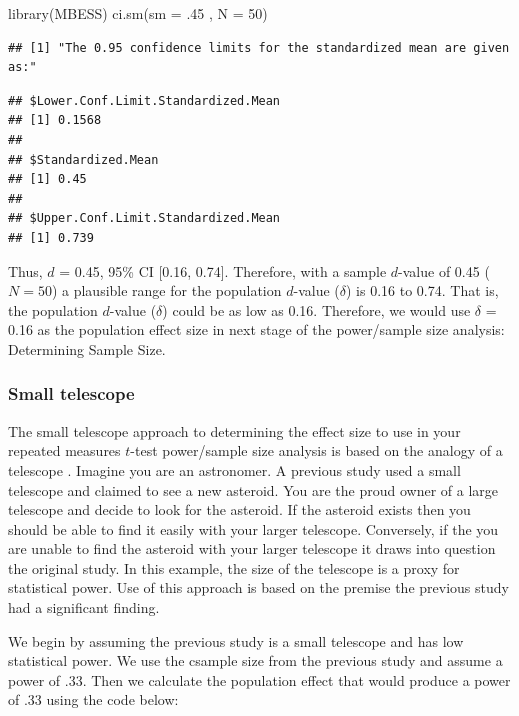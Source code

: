 \documentclass[
]{krantz}
\makeatletter
\newenvironment{Shaded}{\begin{snugshade}}{\end{snugshade}}
\newcommand{\AttributeTok}[1]{\textcolor[rgb]{0.61,0.61,0.61}{#1}}
\newcommand{\DecValTok}[1]{\textcolor[rgb]{0.06,0.06,0.06}{#1}}
\newcommand{\FunctionTok}[1]{\textcolor[rgb]{0,0,0}{#1}}
\newcommand{\NormalTok}[1]{#1}
\newenvironment{kframe}{%
\medskip{}
\setlength{\fboxsep}{.8em}
 \def\at@end@of@kframe{}%
 \ifinner\ifhmode%
  \def\at@end@of@kframe{\end{minipage}}%
  \begin{minipage}{\columnwidth}%
 \fi\fi%
 \def\FrameCommand##1{\hskip\@totalleftmargin \hskip-\fboxsep
 \colorbox{shadecolor}{##1}\hskip-\fboxsep
     \hskip-\linewidth \hskip-\@totalleftmargin \hskip\columnwidth}%
 \MakeFramed {\advance\hsize-\width
   \@totalleftmargin\z@ \linewidth\hsize
   \@setminipage}}%
 {\par\unskip\endMakeFramed%
 \at@end@of@kframe}
\renewenvironment{Shaded}{\begin{kframe}}{\end{kframe}}
\makeatother
\begin{document}
\begin{Shaded}
\begin{Highlighting}[]
\FunctionTok{library}\NormalTok{(MBESS)}
\FunctionTok{ci.sm}\NormalTok{(}\AttributeTok{sm =}\NormalTok{ .}\DecValTok{45}\NormalTok{ , }\AttributeTok{N =} \DecValTok{50}\NormalTok{) }
\end{Highlighting}
\end{Shaded}

\begin{verbatim}
## [1] "The 0.95 confidence limits for the standardized mean are given as:"
\end{verbatim}

\begin{verbatim}
## $Lower.Conf.Limit.Standardized.Mean
## [1] 0.1568
## 
## $Standardized.Mean
## [1] 0.45
## 
## $Upper.Conf.Limit.Standardized.Mean
## [1] 0.739
\end{verbatim}

Thus, \(d\) = 0.45, 95\% CI {[}0.16, 0.74{]}. Therefore, with a sample \(d\)-value of 0.45 (\(N=50\)) a plausible range for the population \(d\)-value (\(\delta\)) is 0.16 to 0.74. That is, the population \(d\)-value (\(\delta\)) could be as low as 0.16. Therefore, we would use \(\delta\) = 0.16 as the population effect size in next stage of the power/sample size analysis: Determining Sample Size.

\hypertarget{small-telescope-1}{%
\subsubsection{Small telescope}\label{small-telescope-1}}

The small telescope approach to determining the effect size to use in your repeated measures \(t\)-test power/sample size analysis is based on the analogy of a telescope \citep{simonsohn2015small}. Imagine you are an astronomer. A previous study used a small telescope and claimed to see a new asteroid. You are the proud owner of a large telescope and decide to look for the asteroid. If the asteroid exists then you should be able to find it easily with your larger telescope. Conversely, if the you are unable to find the asteroid with your larger telescope it draws into question the original study. In this example, the size of the telescope is a proxy for statistical power. Use of this approach is based on the premise the previous study had a significant finding.

We begin by assuming the previous study is a small telescope and has low statistical power. We use the csample size from the previous study and assume a power of .33. Then we calculate the population effect that would produce a power of .33 using the code below:
\end{document}
